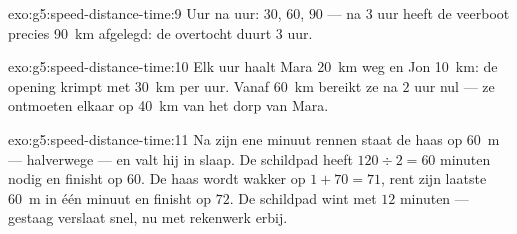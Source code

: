\begin{solution}{exo:g5:speed-distance-time:9}
Uur na uur: $30$, $60$, $90$ --- na $3$ uur heeft de veerboot
precies \qty{90}{km} afgelegd: de overtocht duurt $3$ uur.
\end{solution}

\begin{solution}{exo:g5:speed-distance-time:10}
Elk uur haalt Mara \qty{20}{km} weg en Jon \qty{10}{km}: de opening
krimpt met \qty{30}{km} per uur. Vanaf \qty{60}{km} bereikt ze na $2$
uur nul --- ze ontmoeten elkaar op \qty{40}{km} van het dorp van
Mara.
\end{solution}

\begin{solution}{exo:g5:speed-distance-time:11}
Na zijn ene minuut rennen staat de haas op \qty{60}{m} --- halverwege
--- en valt hij in slaap. De schildpad heeft $120 \div 2 = 60$ minuten
nodig en finisht op  $60$. De haas wordt wakker op 
$1 + 70 = 71$, rent zijn laatste \qty{60}{m} in één minuut en finisht
op  $72$. De schildpad wint met $12$ minuten --- gestaag
verslaat snel, nu met rekenwerk erbij.
\end{solution}

